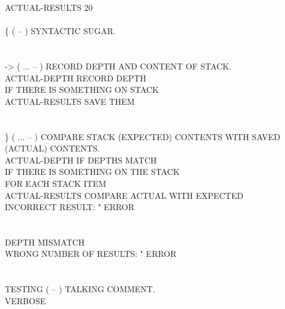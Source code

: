 \begin{tt}
\tab[.7]  ACTUAL-RESULTS 20   \\
\\
\word{:} \{ \tab[2.8]  ( -- ) SYNTACTIC SUGAR.\\
\tab \word{;} \\
\\
\word{:} -> \tab[2.2]  ( ... -- ) RECORD DEPTH AND CONTENT OF STACK.\\
\tab {}  ACTUAL-DEPTH \word{!}				\tab[5.9]   RECORD DEPTH\\
\tab {} 										\tab[16.1]  IF THERE IS SOMETHING ON STACK\\
  ACTUAL-RESULTS   \word{+} \word{!}  \tab[.6]  SAVE THEM\\
\tab {} \word{;} \\
\\
\word{:} \} \tab[2.8]  ( ... -- ) COMPARE STACK (EXPECTED) CONTENTS WITH SAVED\\
\tab[5.2]  (ACTUAL) CONTENTS.\\
\tab {} ACTUAL-DEPTH  \word{=} 		\tab[4.85]   IF DEPTHS MATCH\\
\tab[2]   						\tab[9.05]  IF THERE IS SOMETHING ON THE STACK\\
 											\tab[14.8]  FOR EACH STACK ITEM\\
\tab[4]			 ACTUAL-RESULTS   \word{+} 	\tab[.6]  COMPARE ACTUAL WITH EXPECTED\\
\tab[4]			   INCORRECT RESULT: " ERROR  \\
\tab[3]		\\
\tab[2] \\
\tab {}												\tab[17.4]  DEPTH MISMATCH\\
\tab[2]  WRONG NUMBER OF RESULTS: " ERROR\\
\tab {} \word{;} \\
\\
\word{:} TESTING \tab[.65]  ( -- ) TALKING COMMENT.\\
\tab {} VERBOSE  \\
\tab {}       \word{!}\\
\tab {}  \word{!} \\
\tab {} \word{;}
\end{tt}

